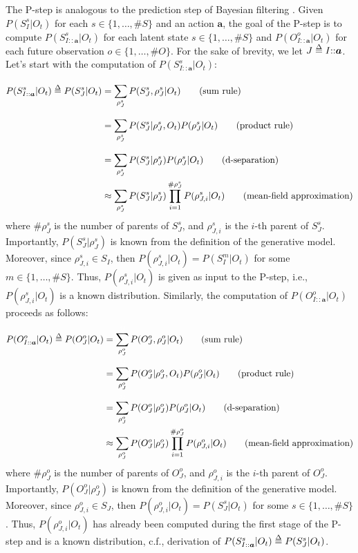 \documentclass[twoside,11pt]{article}
\def\delequal{\mathrel{\ensurestackMath{\stackon[1pt]{=}{\scriptstyle\Delta}}}}
\newcommand{\nb}[1]{\# #1}
\begin{document}
The P-step is analogous to the prediction step of Bayesian filtering \citep{BAYESIAN_FILTERING}. Given $P(S_{I}^s|O_t)$ for each $s \in \{1, \hdots, \nb{S}\}$ and an action $\bm{a}$, the goal of the P-step is to compute $P(S_{I{::}\bm{a}}^s|O_t)$ for each latent state $s \in \{1, \hdots, \nb{S}\}$ and $P(O_{I{::}\bm{a}}^o|O_t)$ for each future observation $o \in \{1, \hdots, \nb{O}\}$. For the sake of brevity, we let $J \delequal I{::}\bm{a}$. Let's start with the computation of $P(S_{I{::}\bm{a}}^s|O_t)$:
\begin{align*}
P(S_{I{::}\bm{a}}^s|O_t) \delequal P(S_J^s|O_t) &= \sum_{\rho_J^s}^{{\color{white}M}} P(S_J^s, \rho_J^s |O_t) \tag{sum rule}\\
&= \sum_{\rho_J^s}^{{\color{white}M}} P(S_J^s| \rho_J^s, O_t)P(\rho_J^s| O_t) \tag{product rule}\\
&= \sum_{\rho_J^s}^{{\color{white}M}} P(S_J^s| \rho_J^s)P(\rho_J^s| O_t) \tag{d-separation}\\
&\approx \sum_{\rho_J^s} P(S_J^s| \rho_J^s) \prod_{i=1}^{\nb{\rho_J^s}} P(\rho_{J,i}^s| O_t) \tag{mean-field approximation}
\end{align*}
where $\nb{\rho_J^s}$ is the number of parents of $S^s_J$, and $\rho_{J,i}^s$ is the $i$-th parent of $S^s_J$. Importantly, $P(S_J^s| \rho_J^s)$ is known from the definition of the generative model. Moreover, since $\rho_{J,i}^s \in S_I$, then $P(\rho_{J,i}^s| O_t) = P(S_{I}^m|O_t)$ for some $m \in \{1, \hdots, \nb{S}\}$. Thus, $P(\rho_{J,i}^s| O_t)$ is given as input to the P-step, i.e., $P(\rho_{J,i}^s| O_t)$ is a known distribution. Similarly, the computation of  $P(O_{I{::}\bm{a}}^o|O_t)$ proceeds as follows:
\begin{align*}
P(O_{I{::}\bm{a}}^o|O_t) \delequal P(O_J^o|O_t) &= \sum_{\rho_J^o}^{{\color{white}M}} P(O_J^o, \rho_J^o |O_t) \tag{sum rule}\\
&= \sum_{\rho_J^o}^{{\color{white}M}} P(O_J^o| \rho_J^o, O_t)P(\rho_J^o| O_t) \tag{product rule}\\
&= \sum_{\rho_J^o}^{{\color{white}M}} P(O_J^o| \rho_J^o)P(\rho_J^o| O_t) \tag{d-separation}\\
&\approx \sum_{\rho_J^o} P(O_J^o| \rho_J^o) \prod_{i=1}^{\nb{\rho_J^o}} P(\rho_{J,i}^o| O_t) \tag{mean-field approximation}
\end{align*}
where $\nb{\rho_J^o}$ is the number of parents of $O^o_J$, and $\rho_{J,i}^o$ is the $i$-th parent of $O^o_J$. Importantly, $P(O_J^o| \rho_J^o)$ is known from the definition of the generative model. Moreover, since $\rho_{J,i}^o \in S_J$, then $P(\rho_{J,i}^o| O_t) = P(S_{J}^s|O_t)$ for some $s \in \{1, \hdots, \nb{S}\}$. Thus, $P(\rho_{J,i}^o| O_t)$ has already been computed during the first stage of the P-step and is a known distribution, c.f., derivation of $P(S_{I{::}\bm{a}}^s|O_t) \delequal P(S_J^s|O_t)$.
\end{document}
